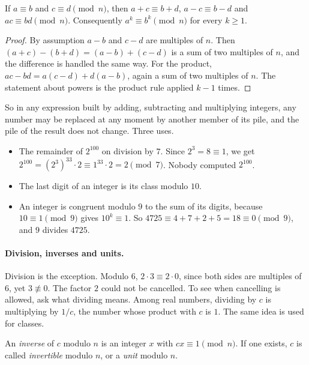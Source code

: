 \begin{proposition}
If $a \equiv b$ and $c \equiv d \pmod n$, then $a + c \equiv b + d$, $a - c \equiv b - d$ and $ac \equiv bd \pmod n$. Consequently $a^k \equiv b^k \pmod n$ for every $k \ge 1$.
\end{proposition}

\begin{proof}
By assumption $a - b$ and $c - d$ are multiples of $n$. Then $(a + c) - (b + d) = (a - b) + (c - d)$ is a sum of two multiples of $n$, and the difference is handled the same way. For the product, $ac - bd = a(c - d) + d(a - b)$, again a sum of two multiples of $n$. The statement about powers is the product rule applied $k - 1$ times.
\end{proof}

So in any expression built by adding, subtracting and multiplying integers, any number may be replaced at any moment by another member of its pile, and the pile of the result does not change. Three uses.

\begin{itemize}[nosep,leftmargin=*]
\item The remainder of $2^{100}$ on division by $7$. Since $2^3 = 8 \equiv 1$, we get $2^{100} = (2^3)^{33} \cdot 2 \equiv 1^{33} \cdot 2 = 2 \pmod 7$. Nobody computed $2^{100}$.
\item The last digit of an integer is its class modulo $10$.
\item An integer is congruent modulo $9$ to the sum of its digits, because $10 \equiv 1 \pmod 9$ gives $10^k \equiv 1$. So $4725 \equiv 4 + 7 + 2 + 5 = 18 \equiv 0 \pmod 9$, and $9$ divides $4725$.
\end{itemize}

\paragraph{Division, inverses and units.} Division is the exception. Modulo $6$, $2 \cdot 3 \equiv 2 \cdot 0$, since both sides are multiples of $6$, yet $3 \not\equiv 0$. The factor $2$ could not be cancelled. To see when cancelling is allowed, ask what dividing means. Among real numbers, dividing by $c$ is multiplying by $1/c$, the number whose product with $c$ is $1$. The same idea is used for classes.

\begin{definition}
An \emph{inverse} of $c$ modulo $n$ is an integer $x$ with $cx \equiv 1 \pmod n$. If one exists, $c$ is called \emph{invertible} modulo $n$, or a \emph{unit} modulo $n$.
\end{definition}

